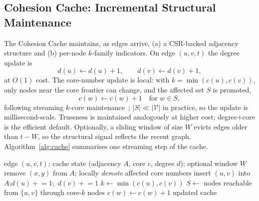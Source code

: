 \documentclass[sigconf,nonacm,review]{acmart}
\newcommand{\Vcal}{\mathcal{V}}
\begin{document}
\subsection{Cohesion Cache: Incremental Structural Maintenance}
\label{sec:cache}
The Cohesion Cache maintains, as edges arrive, (a) a CSR-backed adjacency
structure and (b) per-node $k$-family indicators. On edge $(u,v,t)$ the degree
update is
\begin{equation}
d(u)\leftarrow d(u)+1,\qquad d(v)\leftarrow d(v)+1,
\end{equation}
at $O(1)$ cost. The core-number update is local: with $k=\min(c(u),c(v))$, only
nodes near the core frontier can change, and the affected set $S$ is promoted,
\begin{equation}
c(w)\leftarrow c(w)+1\quad\text{for }w\in S,
\end{equation}
following streaming $k$-core
maintenance~\cite{batagelj2003cores,sariyuce2013kcorestream}; $|S|\ll|\Vcal|$ in
practice, so the update is millisecond-scale. Trussness is maintained
analogously at higher cost; degree$+$core is the efficient default. Optionally,
a sliding window of size $W$ evicts edges older than $t-W$, so the structural
signal reflects the recent graph. Algorithm~\ref{alg:cache} summarises one
streaming step of the cache.

\begin{algorithm}[t]
\caption{Cohesion Cache --- one streaming step}
\label{alg:cache}
\small
\begin{algorithmic}[1]
\Require edge $(u,v,t)$; cache state (adjacency $A$, core $c$, degree $d$);
optional window $W$
 
    \State remove $(x,y)$ from $A$; locally \emph{demote} affected core numbers
  \EndFor
\EndIf
\State insert $(u,v)$ into $A$;\quad $d(u)\!\mathrel{+}=\!1$;\ $d(v)\!\mathrel{+}=\!1$
\State $k\gets\min(c(u),c(v))$
\State $S\gets$ nodes reachable from $\{u,v\}$ through core-$k$ nodes
    \State $c(w)\gets c(w)+1$
  \EndIf
\EndFor
\State \Return updated cache
\end{algorithmic}
\end{algorithm}
\end{document}
